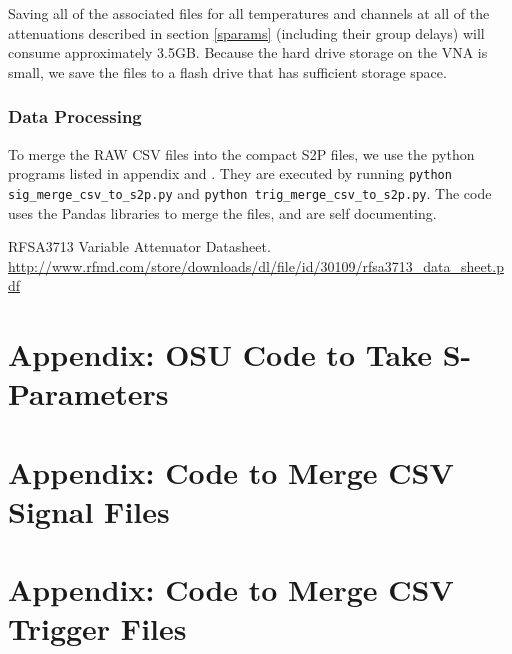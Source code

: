 \documentclass[letter,12pt]{article}
\begin{document}
Saving all of the associated files for all temperatures and channels at all of the attenuations described in section \ref{sparams} (including their group delays) will consume approximately 3.5GB. Because the hard drive storage on the VNA is small, we save the files to a flash drive that has sufficient storage space.


\subsubsection{Data Processing}\label{data_processing}

To merge the RAW CSV files into the compact S2P files, we use the python programs listed in appendix \label{sig_merg} and \label{trig_merg}. They are executed by running  \texttt{python sig\_merge\_csv\_to\_s2p.py} and \texttt{python trig\_merge\_csv\_to\_s2p.py}. The code uses the Pandas libraries to merge the files, and are self documenting.

\begin{thebibliography}{1}
RFSA3713 Variable Attenuator Datasheet. \href{http://www.rfmd.com/store/downloads/dl/file/id/30109/rfsa3713_data_sheet.pdf}{http://www.rfmd.com/store/downloads/dl/file/id/30109/rfsa3713\_{}data\_{}sheet.pdf}
\end{thebibliography}
\appendix
\newpage
\section{Appendix: OSU Code to Take S-Parameters} \label{code}
\begin{tiny}

\end{tiny}

\newpage
\section{Appendix: Code to Merge CSV Signal Files} \label{sig_merg}
\begin{tiny}

\end{tiny}

\newpage
\section{Appendix: Code to Merge CSV Trigger Files} \label{trig_merg}
\begin{tiny}

\end{tiny}
\end{document}
